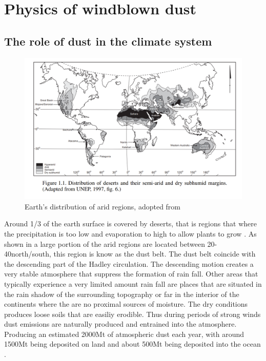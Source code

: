 \section{Physics of windblown dust}\label{seq:physics_of_dust}

\subsection{The role of dust in the climate system}
\begin{figure}[htpb]
    \centering
    \includegraphics[width=\textwidth]{texfiles/figs/Desert_distrubtion.PNG}
    \caption{Earth's distribution of arid regions, adopted from \textcite{williams_climate_2014}}
    \label{fig:desert_distrubtion}
\end{figure}
Around 1/3 of the earth surface is covered by deserts, that is regions that where the precipitation is too low and evaporation to high to allow plants to grow \parencite{williams_climate_2014}. As shown in  a large portion of the arid regions are located between 20\degree - 40\degree north/south, this region is know as the dust belt. The dust belt coincide with the descending part of the Hadley circulation. The descending motion creates a very stable atmosphere that suppress the formation of rain fall. Other areas that typically experience a very limited amount rain fall are places that are situated in the rain shadow of the surrounding topography or far in the interior of the continents where the are no proximal sources of moisture. The dry conditions produces loose soils that are easiliy erodible. Thus during periods of strong winds dust emissions are naturally produced and entrained into the atmosphere. Producing an estimated 2000Mt of atmospheric dust each year, with around 1500Mt being deposited on land and about 500Mt being deposited into the ocean \parencite{shao2011dust}.   

